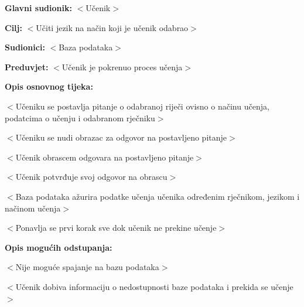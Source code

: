 					\noindent {}
					\begin{packed_item}
	
						\item \textbf{Glavni sudionik: }$<$Učenik$>$
						\item  \textbf{Cilj:} $<$Učiti jezik na način koji je učenik odabrao$>$
						\item  \textbf{Sudionici:} $<$Baza podataka$>$
						\item  \textbf{Preduvjet:} $<$Učenik je pokrenuo proces učenja$>$
						\item  \textbf{Opis osnovnog tijeka:}
						
						\item[] \begin{packed_enum}
	
							\item $<$Učeniku se postavlja pitanje o odabranoj riječi ovisno o načinu učenja, podatcima o učenju i odabranom rječniku$>$
							\item $<$Učeniku se nudi obrazac za odgovor na postavljeno pitanje$>$
							\item $<$Učenik obrascem odgovara na postavljeno pitanje$>$
							\item $<$Učenik potvrđuje svoj odgovor na obrascu$>$
							\item $<$Baza podataka ažurira podatke učenja učenika određenim rječnikom, jezikom i načinom učenja$>$
							\item $<$Ponavlja se prvi korak sve dok učenik ne prekine učenje$>$
						\end{packed_enum}

						\item  \textbf{Opis mogućih odstupanja:}
						
						\item[] \begin{packed_item}
	
							\item[5.a] $<$Nije moguće spajanje na bazu podataka$>$
							\item[] \begin{packed_enum}
								
								\item $<$Učenik dobiva informaciju o nedostupnosti baze podataka i prekida se učenje$>$
								
							\end{packed_enum}
						\end{packed_item}
						
					\end{packed_item}

